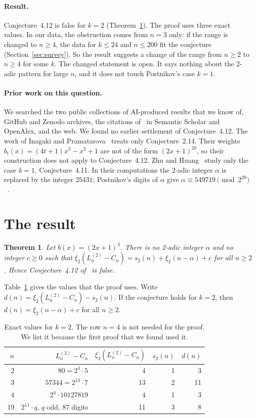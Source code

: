 \documentclass[11pt]{article}
\newtheorem{theorem}{Theorem}
\theoremstyle{remark}
\begin{document}
\paragraph{Result.} Conjecture~4.12 is false for $k=2$ (Theorem~\ref{thm:main}). The proof uses three exact values. In our data, the obstruction comes from $n=3$ only: if the range is changed to $n\ge 4$, the data for $k\le 24$ and $n\le 200$ fit the conjecture (Section~\ref{sec:survey}). So the result suggests a change of the range from $n\ge2$ to $n\ge4$ for some $k$. The changed statement is open. It says nothing about the 2-adic pattern for large $n$, and it does not touch Postnikov's case $k=1$.

\paragraph{Prior work on this question.} We searched the two public collections of AI-produced results that we know of, GitHub and Zenodo archives, the citations of~\cite{GG} in Semantic Scholar and OpenAlex, and the web. We found no earlier settlement of Conjecture~4.12. The work of Inagaki and Pramatarova~\cite{IP26} treats only Conjecture~2.14. Their weights $b_t(x)=(4t+1)x^3-x^2+1$ are not of the form $(2x+1)^{2k}$, so their construction does not apply to Conjecture~4.12. Zhu and Huang~\cite{ZH} study only the case $k=1$, Conjecture~4.11. In their computations the 2-adic integer $\alpha$ is replaced by the integer $25431$; Postnikov's digits of $\alpha$ give $\alpha\equiv 549719\pmod{2^{20}}$~\cite[Conjecture~3.4]{Pos}.

\section{The result}

\begin{theorem}\label{thm:main}
Let $b(x)=(2x+1)^4$. There is no 2-adic integer $\alpha$ and no integer $c\ge 0$ such that $\xi_2(L^{(2)}_n-C_n)=s_2(n)+\xi_2(n-\alpha)+c$ for all $n\ge2$. Hence Conjecture~4.12 of~\cite{GG} is false.
\end{theorem}

Table~\ref{tab:values} gives the values that the proof uses. Write $d(n)=\xi_2(L^{(2)}_n-C_n)-s_2(n)$. If the conjecture holds for $k=2$, then $d(n)=\xi_2(n-\alpha)+c$ for all $n\ge 2$.

\begin{table}[h]
\centering
\begin{tabular}{rrrrr}
\toprule
$n$ & $L^{(2)}_n-C_n$ & $\xi_2(L^{(2)}_n-C_n)$ & $s_2(n)$ & $d(n)$\\
\midrule
2 & $80=2^4\cdot 5$ & 4 & 1 & 3\\
3 & $57344=2^{13}\cdot 7$ & 13 & 2 & 11\\
4 & $2^4\cdot 10127819$ & 4 & 1 & 3\\
19 & $2^{11}\cdot q$, $q$ odd, 87 digits & 11 & 3 & 8\\
\bottomrule
\end{tabular}
\caption{Exact values for $k=2$. The row $n=4$ is not needed for the proof. We list it because the first proof that we found used it.}
\label{tab:values}
\end{table}
\end{document}
